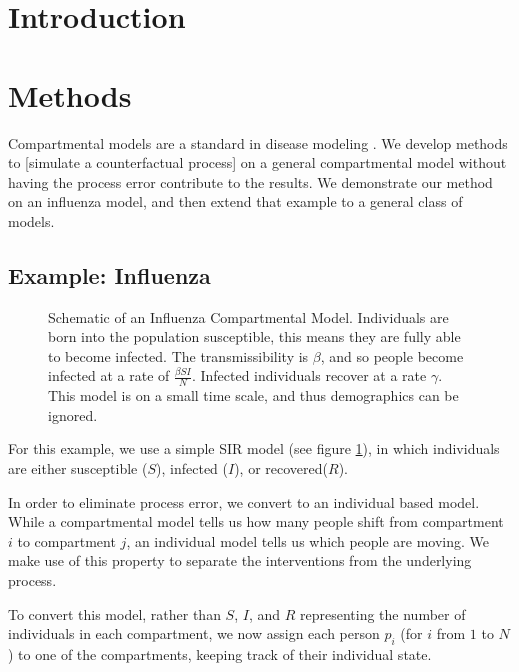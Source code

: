 \documentclass{article}
\begin{document}
\section{Introduction}
\section{Methods}
Compartmental models are a standard in disease modeling \cite{}.%
We develop methods to [simulate a counterfactual process] %
on a general compartmental model without having the process error contribute to the results.  We demonstrate our method on an influenza model, and then extend that example to a general class of models.

\subsection*{Example: Influenza}

\begin{figure}
\label{fig:sir}
\begin{center}
\end{center}
\caption{Schematic of an Influenza Compartmental Model. Individuals are born into the population susceptible, this means they are fully able to become infected.  The transmissibility is $\beta$, and so people become infected at a rate of $\frac{\beta SI}{N}$.  Infected individuals recover at a rate $\gamma$.  This model is on a small time scale, and thus demographics can be ignored.}
\end{figure}

For this example, we use a simple SIR model (see figure \ref{fig:sir}), in which individuals are either susceptible ($S$), infected ($I$), or recovered($R$).

In order to eliminate process error, we convert to an individual based model.  While a compartmental model tells us how many people shift from compartment $i$ to compartment $j$, an individual model tells us which people are moving.  We make use of this property to separate the interventions from the underlying process.

To convert this model, rather than $S$, $I$, and $R$ representing the number of individuals in each compartment, we now assign each person $p_i$ (for $i$ from $1$ to $N$) to one of the compartments, keeping track of their individual state.
\end{document}
